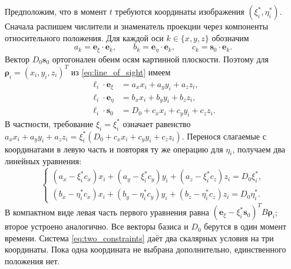 \documentclass[a4paper,12pt]{article}
\begin{document}
Предположим, что в момент $t$ требуются координаты изображения $(\xi_i^*,\eta_i^*)$. Сначала распишем числители и знаменатель проекции через компоненты относительного положения. Для каждой оси $k\in\{x,y,z\}$ обозначим
\begin{equation}
    a_k=\mathbf e_\xi\cdot\mathbf e_k,\qquad
    b_k=\mathbf e_\eta\cdot\mathbf e_k,\qquad
    c_k=\mathbf s_0\cdot\mathbf e_k.
    \label{eq:frame_coefficients}
\end{equation}
Вектор $D_0\mathbf s_0$ ортогонален обеим осям картинной плоскости. Поэтому для $\boldsymbol\rho_i=(x_i,y_i,z_i)^T$ из \eqref{eq:line_of_sight} имеем
\begin{equation}
\begin{aligned}
    \boldsymbol\ell_i\cdot\mathbf e_\xi
        &=a_xx_i+a_yy_i+a_zz_i,\\
    \boldsymbol\ell_i\cdot\mathbf e_\eta
        &=b_xx_i+b_yy_i+b_zz_i,\\
    \boldsymbol\ell_i\cdot\mathbf s_0
        &=D_0+c_xx_i+c_yy_i+c_zz_i.
\end{aligned}
    \label{eq:projection_components}
\end{equation}
В частности, требование $\xi_i=\xi_i^*$ означает равенство $a_xx_i+a_yy_i+a_zz_i=\xi_i^*(D_0+c_xx_i+c_yy_i+c_zz_i)$. Перенося слагаемые с координатами в левую часть и повторяя ту же операцию для $\eta_i$, получаем два линейных уравнения:
\begin{equation}
    \begin{cases}
    (a_x-\xi_i^*c_x)x_i+(a_y-\xi_i^*c_y)y_i
                           +(a_z-\xi_i^*c_z)z_i=D_0\xi_i^*,\\
    (b_x-\eta_i^*c_x)x_i+(b_y-\eta_i^*c_y)y_i
                           +(b_z-\eta_i^*c_z)z_i=D_0\eta_i^*.
    \end{cases}
    \label{eq:two_constraints}
\end{equation}
В компактном виде левая часть первого уравнения равна $(\mathbf e_\xi-\xi_i^*\mathbf s_0)^TB\boldsymbol\rho_i$; второе устроено аналогично. Все векторы базиса и $D_0$ берутся в один момент времени. Система \eqref{eq:two_constraints} даёт два скалярных условия на три координаты. Пока одна координата не выбрана дополнительно, единственного положения нет.
\end{document}

